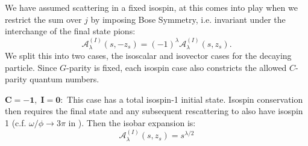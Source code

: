 \documentclass[10pt, aps,prd,amsmath,amssymb,superscriptaddress,onecolumn,
nofootinbib,showpacs,preprintnumbers]{revtex4-1}
\begin{document}
We have assumed scattering in a fixed isospin, at this comes into play when we restrict the sum over \(j\) by imposing Bose Symmetry, i.e. invariant under the interchange of the final state pions:
 \begin{equation}
   \mathcal{A}^{(I)}_\lambda(s,-z_s) = (-1)^{\lambda} \mathcal{A}_\lambda^{(I)}(s,z_s).
 \end{equation}
 We split this into two cases, the isoscalar and isovector cases for the decaying particle. Since \(G\)-parity is fixed, each isospin case also constricts the allowed \(C\)-parity quantum numbers.

\hfill \break
\(\bm{C = -1, \; I = 0:}\) This case has a total isospin-1 initial state. Isospin conservation then requires the final state and any subsequent rescattering to also have isospin 1 (c.f. \( \omega/\phi \to 3\pi \) in \cite{Danilkin:2014cra,Niecknig:2012sj}). Then the isobar expansion is:
  \begin{equation}
    \mathcal{A}^{(I)}_\lambda(s,z_s) = s^{\lambda/2}
  \end{equation}




\end{document}

